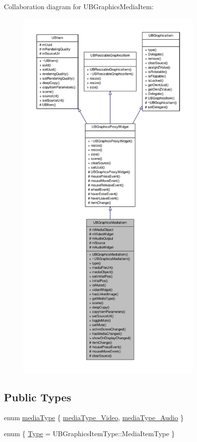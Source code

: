 Collaboration diagram for U\-B\-Graphics\-Media\-Item\-:
\nopagebreak
\begin{figure}[H]
\begin{center}
\leavevmode
\includegraphics[height=550pt]{d3/d2c/class_u_b_graphics_media_item__coll__graph}
\end{center}
\end{figure}
\subsection*{Public Types}
\begin{DoxyCompactItemize}
\item 
enum \hyperlink{class_u_b_graphics_media_item_acf0611c604c6a618b1b920389c3ae6f6}{media\-Type} \{ \hyperlink{class_u_b_graphics_media_item_acf0611c604c6a618b1b920389c3ae6f6ae5c40b3772c6427e415cfec2054318e6}{media\-Type\-\_\-\-Video}, 
\hyperlink{class_u_b_graphics_media_item_acf0611c604c6a618b1b920389c3ae6f6a49fc08ddeda17dc732caf360a16d571e}{media\-Type\-\_\-\-Audio}
 \}
\item 
enum \{ \hyperlink{class_u_b_graphics_media_item_a940b930449b3aaf6cd9be3639d8d19f2a1694a0279d66b57a1604aba2a2921781}{Type} =  U\-B\-Graphics\-Item\-Type\-:\-:Media\-Item\-Type
 \}
\end{DoxyCompactItemize}
